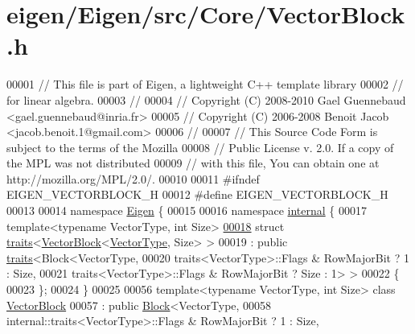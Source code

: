 \hypertarget{eigen_2_eigen_2src_2_core_2_vector_block_8h_source}{}\section{eigen/\+Eigen/src/\+Core/\+Vector\+Block.h}
\label{eigen_2_eigen_2src_2_core_2_vector_block_8h_source}

\begin{DoxyCode}
00001 \textcolor{comment}{// This file is part of Eigen, a lightweight C++ template library}
00002 \textcolor{comment}{// for linear algebra.}
00003 \textcolor{comment}{//}
00004 \textcolor{comment}{// Copyright (C) 2008-2010 Gael Guennebaud <gael.guennebaud@inria.fr>}
00005 \textcolor{comment}{// Copyright (C) 2006-2008 Benoit Jacob <jacob.benoit.1@gmail.com>}
00006 \textcolor{comment}{//}
00007 \textcolor{comment}{// This Source Code Form is subject to the terms of the Mozilla}
00008 \textcolor{comment}{// Public License v. 2.0. If a copy of the MPL was not distributed}
00009 \textcolor{comment}{// with this file, You can obtain one at http://mozilla.org/MPL/2.0/.}
00010 
00011 \textcolor{preprocessor}{#ifndef EIGEN\_VECTORBLOCK\_H}
00012 \textcolor{preprocessor}{#define EIGEN\_VECTORBLOCK\_H}
00013 
00014 \textcolor{keyword}{namespace }\hyperlink{namespace_eigen}{Eigen} \{ 
00015 
00016 \textcolor{keyword}{namespace }\hyperlink{namespaceinternal}{internal} \{
00017 \textcolor{keyword}{template}<\textcolor{keyword}{typename} VectorType, \textcolor{keywordtype}{int} Size>
\hyperlink{struct_eigen_1_1internal_1_1traits_3_01_vector_block_3_01_vector_type_00_01_size_01_4_01_4}{00018} \textcolor{keyword}{struct }\hyperlink{struct_eigen_1_1internal_1_1traits}{traits}<\hyperlink{group___core___module_class_eigen_1_1_vector_block}{VectorBlock}<\hyperlink{struct_vector_type}{VectorType}, Size> >
00019   : \textcolor{keyword}{public} \hyperlink{struct_eigen_1_1internal_1_1traits}{traits}<Block<VectorType,
00020                      traits<VectorType>::Flags & RowMajorBit ? 1 : Size,
00021                      traits<VectorType>::Flags & RowMajorBit ? Size : 1> >
00022 \{
00023 \};
00024 \}
00025 
00056 \textcolor{keyword}{template}<\textcolor{keyword}{typename} VectorType, \textcolor{keywordtype}{int} Size> \textcolor{keyword}{class }\hyperlink{group___core___module_class_eigen_1_1_vector_block}{VectorBlock}
00057   : \textcolor{keyword}{public} \hyperlink{group___core___module_class_eigen_1_1_block}{Block}<VectorType,
00058                      internal::traits<VectorType>::Flags & RowMajorBit ? 1 : Size,

\end{DoxyCode}
